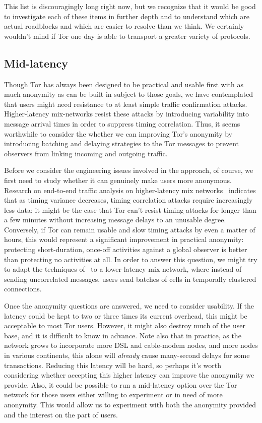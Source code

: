 \documentclass{llncs}
\begin{document}
This list is discouragingly long right now, but we recognize that it
would be good to investigate each of these items in further depth and to
understand which are actual roadblocks and which are easier to resolve
than we think. We certainly wouldn't mind if Tor one day is able to
transport a greater variety of protocols.

\subsection{Mid-latency}
\label{subsec:mid-latency}

Though Tor has always been designed to be practical and usable first
with as much anonymity as can be built in subject to those goals, we
have contemplated that users might need resistance to at least simple
traffic confirmation attacks.  Higher-latency mix-networks resist these
attacks by introducing variability into message arrival times in order to
suppress timing correlation.  Thus, it seems worthwhile to consider the
whether we can improving Tor's anonymity by introducing batching and delaying
strategies to the Tor messages to prevent observers from linking incoming and
outgoing traffic.

Before we consider the engineering issues involved in the approach, of
course, we first need to study whether it can genuinely make users more
anonymous.  Research on end-to-end traffic analysis on higher-latency mix
networks~\cite{e2e-traffic} indicates that as timing variance decreases,
timing correlation attacks require increasingly less data; it might be the
case that Tor can't resist timing attacks for longer than a few minutes
without increasing message delays to an unusable degree.  Conversely, if Tor
can remain usable and slow timing attacks by even a matter of hours, this
would represent a significant improvement in practical anonymity: protecting
short-duration, once-off activities against a global observer is better than
protecting no activities at all.  In order to answer this question, we might
try to adapt the techniques of~\cite{e2e-traffic} to a lower-latency mix
network, where instead of sending uncorrelated messages, users send batches
of cells in temporally clustered connections.

Once the anonymity questions are answered, we need to consider usability.  If
the latency could be kept to two or three times its current overhead, this
might be acceptable to most Tor users. However, it might also destroy much of
the user base, and it is difficult to know in advance.  Note also that in
practice, as the network grows to incorporate more DSL and cable-modem nodes,
and more nodes in various continents, this alone will \emph{already} cause
many-second delays for some transactions.  Reducing this latency will be
hard, so perhaps it's worth considering whether accepting this higher latency
can improve the anonymity we provide.  Also, it could be possible to
run a mid-latency option over the Tor network for those
users either willing to experiment or in need of more
anonymity.  This would allow us to experiment with both
the anonymity provided and the interest on the part of users.
\end{document}
